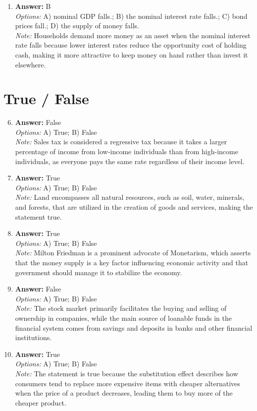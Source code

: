 \documentclass[12pt]{article}
\begin{document}
\begin{enumerate}[label=\arabic*.]
\\ \textit{Note:} A bilateral monopoly occurs when a single buyer (monopsony) and a single seller (monopoly) interact in the market, resulting in unique bargaining dynamics that differ from typical competitive or monopolistic scenarios.
\item \textbf{Answer:} B
\\ \textit{Options:} A) nominal GDP falls.; B) the nominal interest rate falls.; C) bond prices fall.; D) the supply of money falls.
\\ \textit{Note:} Households demand more money as an asset when the nominal interest rate falls because lower interest rates reduce the opportunity cost of holding cash, making it more attractive to keep money on hand rather than invest it elsewhere.
\end{enumerate}

\section*{True / False}
\begin{enumerate}[label=\arabic*.]
\setcounter{enumi}{5}
\item \textbf{Answer:} False
\\ \textit{Options:} A) True; B) False
\\ \textit{Note:} Sales tax is considered a regressive tax because it takes a larger percentage of income from low-income individuals than from high-income individuals, as everyone pays the same rate regardless of their income level.
\item \textbf{Answer:} True
\\ \textit{Options:} A) True; B) False
\\ \textit{Note:} Land encompasses all natural resources, such as soil, water, minerals, and forests, that are utilized in the creation of goods and services, making the statement true.
\item \textbf{Answer:} True
\\ \textit{Options:} A) True; B) False
\\ \textit{Note:} Milton Friedman is a prominent advocate of Monetarism, which asserts that the money supply is a key factor influencing economic activity and that government should manage it to stabilize the economy.
\item \textbf{Answer:} False
\\ \textit{Options:} A) True; B) False
\\ \textit{Note:} The stock market primarily facilitates the buying and selling of ownership in companies, while the main source of loanable funds in the financial system comes from savings and deposits in banks and other financial institutions.
\item \textbf{Answer:} True
\\ \textit{Options:} A) True; B) False
\\ \textit{Note:} The statement is true because the substitution effect describes how consumers tend to replace more expensive items with cheaper alternatives when the price of a product decreases, leading them to buy more of the cheaper product.
\end{enumerate}
\end{document}
